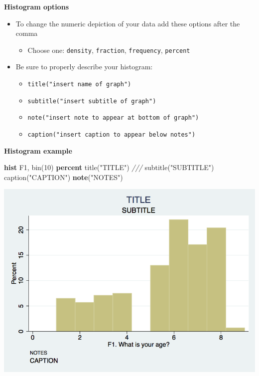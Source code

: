 \documentclass[
]{book}
\newenvironment{Shaded}{\begin{snugshade}}{\end{snugshade}}
\newcommand{\BaseNTok}[1]{\textcolor[rgb]{0.00,0.00,0.81}{#1}}
\newcommand{\CommentTok}[1]{\textcolor[rgb]{0.56,0.35,0.01}{\textit{#1}}}
\newcommand{\KeywordTok}[1]{\textcolor[rgb]{0.13,0.29,0.53}{\textbf{#1}}}
\newcommand{\NormalTok}[1]{#1}
\newcommand{\StringTok}[1]{\textcolor[rgb]{0.31,0.60,0.02}{#1}}
\providecommand{\tightlist}{%
  \setlength{\itemsep}{0pt}\setlength{\parskip}{0pt}}
\begin{document}
\textbf{Histogram options}

\begin{itemize}
\tightlist
\item
  To change the numeric depiction of your data add these options after the comma

  \begin{itemize}
  \tightlist
  \item
    Choose one: \texttt{density}, \texttt{fraction}, \texttt{frequency}, \texttt{percent}
  \end{itemize}
\item
  Be sure to properly describe your histogram:

  \begin{itemize}
  \tightlist
  \item
    \texttt{title("insert\ name\ of\ graph")}
  \item
    \texttt{subtitle("insert\ subtitle\ of\ graph")}
  \item
    \texttt{note("insert\ note\ to\ appear\ at\ bottom\ of\ graph")}
  \item
    \texttt{caption("insert\ caption\ to\ appear\ below\ notes")}
  \end{itemize}
\end{itemize}

\textbf{Histogram example}

\begin{Shaded}
\begin{Highlighting}[]
\KeywordTok{hist}\NormalTok{ F1, }\BaseNTok{bin}\NormalTok{(10) }\KeywordTok{percent} \BaseNTok{title}\NormalTok{(}\StringTok{"TITLE"}\NormalTok{) }\CommentTok{///}
  \BaseNTok{subtitle}\NormalTok{(}\StringTok{"SUBTITLE"}\NormalTok{) }\BaseNTok{caption}\NormalTok{(}\StringTok{"CAPTION"}\NormalTok{) }\KeywordTok{note}\NormalTok{(}\StringTok{"NOTES"}\NormalTok{)}
\end{Highlighting}
\end{Shaded}

\includegraphics{Stata/StataGraph/images/hist1.png}
\end{document}
